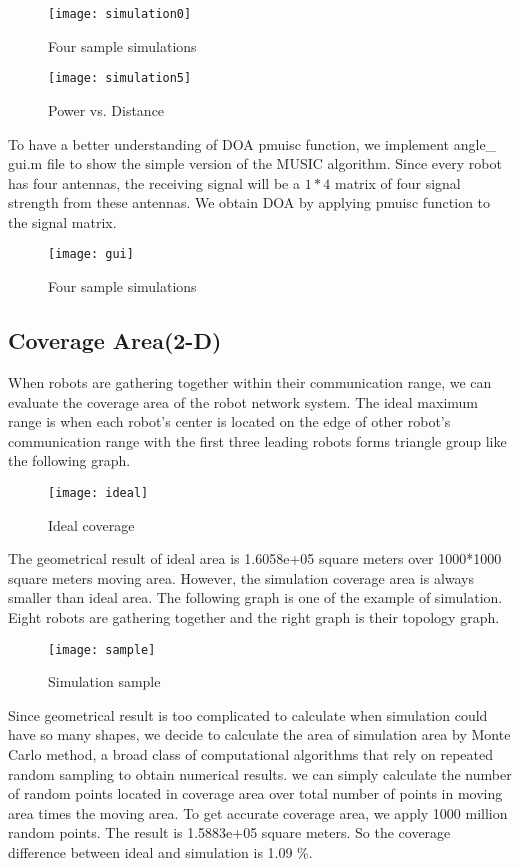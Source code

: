 \begin{figure}[ht]
	\centering
	\texttt{[image: simulation0]}
	\caption{Four sample simulations}
	\end{figure}
	
\begin{figure}[ht]
	\centering
	\texttt{[image: simulation5]}
	\caption{Power vs. Distance}
	\end{figure}
	
\par
	To have a better understanding of DOA pmuisc function, we implement angle\_ gui.m file to show the simple version of the MUSIC algorithm. Since every robot has four antennas, the receiving signal will be a $1 * 4$ matrix of four signal strength from these antennas. We obtain DOA by applying pmuisc function to the signal matrix.\\
    \begin{figure}[ht]
	\centering
	\texttt{[image: gui]}
	\caption{Four sample simulations}
	\end{figure}


\subsection{Coverage Area(2-D)}
\par
When robots are gathering together within their communication range, we can evaluate the coverage area of the robot network 
system. The ideal maximum range is when each robot's center is located on the edge of other robot's communication range with the first three leading robots forms triangle group like the following graph.
\begin{figure}[ht]
	\centering
	\texttt{[image: ideal]}
	\caption{Ideal coverage}
	\end{figure}
	
The geometrical result of ideal area is 1.6058e+05 square meters over 1000*1000 square meters moving area. However, the simulation coverage area is always smaller than ideal area.
The following graph is one of the example of simulation. Eight robots are gathering together and the right graph is their 
topology graph. 
\begin{figure}[ht]
	\centering
	\texttt{[image: sample]}
	\caption{Simulation sample}
	\end{figure}
Since geometrical result is too complicated to calculate when simulation could have so many shapes, we decide to calculate the area of simulation area by Monte Carlo method, a broad class of computational algorithms that rely on repeated random sampling to obtain numerical results. we can simply calculate the number of random points located in coverage area over total number of points in moving area times the moving area. To get accurate coverage area, we apply 1000 million random points. The result is 1.5883e+05 square meters. So the coverage difference between ideal and simulation is 1.09 \%.


